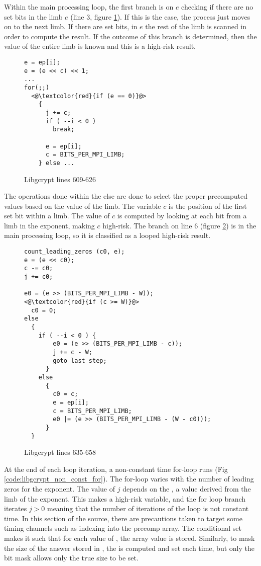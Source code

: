Within the main processing loop, the first branch is on $e$ checking if there
are no set bits in the limb $e$ (line 3, figure \ref{code:libgcrypt_mainloop}).
If this is the case, the process just moves on to the next limb. If there are
set bits, in $e$ the rest of the limb is scanned in order to compute the result.
If the outcome of this branch is determined, then the value of the entire limb
is known and this is a high-risk result.
\begin{figure}[h!]
\begin{lstlisting}
e = ep[i];
e = (e << c) << 1;
...
for(;;)
  <@\textcolor{red}{if (e == 0)}@>
    {
      j += c;
      if ( --i < 0 )
        break;

      e = ep[i];
      c = BITS_PER_MPI_LIMB;
    } else ...
\end{lstlisting}
\caption{Libgcrypt lines 609-626}
\label{code:libgcrypt_mainloop}
\end{figure}


The operations done within the else are done to select the proper precomputed
values based on the value of the limb. The variable $c$ is the position of the
first set bit within a limb.  The value of $c$ is computed by looking
at each bit from a limb in the exponent, making $c$ high-risk. The branch on
line 6 (figure \ref{code:libgcrypt_c_window}) is in the main processing loop, so it is classified as a looped high-risk result.


\begin{figure}[h!]
\begin{lstlisting}
count_leading_zeros (c0, e);
e = (e << c0);
c -= c0;
j += c0;

e0 = (e >> (BITS_PER_MPI_LIMB - W));
<@\textcolor{red}{if (c >= W)}@>
  c0 = 0;
else
  {
    if ( --i < 0 ) {
        e0 = (e >> (BITS_PER_MPI_LIMB - c));
        j += c - W;
        goto last_step;
      }
    else
      {
        c0 = c;
        e = ep[i];
        c = BITS_PER_MPI_LIMB;
        e0 |= (e >> (BITS_PER_MPI_LIMB - (W - c0)));
      }
  }
\end{lstlisting}
\caption{Libgcrypt lines 635-658}
\label{code:libgcrypt_c_window}
\end{figure}

At the end of each loop iteration, a non-constant time for-loop runs (Fig \ref{code:libgcrypt_non_const_for}). The
for-loop varies with the number of leading zeros for the exponent. The value of
$j$ depends on the , a value derived from the limb of the exponent. This
makes  a high-risk variable, and the for loop branch iterates $j > 0$ meaning
that the number of iterations of the loop is not constant time. In this section
of the source, there are precautions taken to target some timing channels such
as indexing into the precomp array. The conditional set makes it such that for
each value of , the array value is stored. Similarly, to mask the size of the
answer stored in , the  is computed and set each time, but only
the bit mask allows only the true size to be set.

